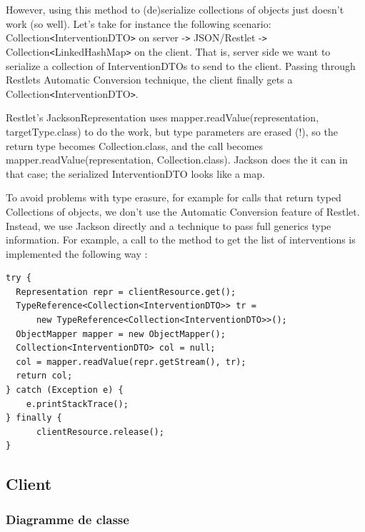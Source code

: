 \documentclass{article}
\begin{document}
However, using this method to (de)serialize collections of objects 
just doesn't work (so well). Let's take for instance the following scenario: Collection\texttt{<}InterventionDTO\texttt{>} 
on server -\texttt{>} JSON/Restlet -\texttt{>} Collection\texttt{<}LinkedHashMap\texttt{>} 
on the client. That is, server side we want to serialize a collection of InterventionDTOs 
to send to the client. Passing through Restlets Automatic Conversion technique, 
the client finally gets a Collection\texttt{<}InterventionDTO\texttt{>}.

Restlet's JacksonRepresentation uses mapper.readValue(representation, 
targetType.class) to do the work, but type parameters are erased (!), so the return 
type becomes Collection.class, and the call becomes mapper.readValue(representation, 
Collection.class). Jackson does the it can in that case; the serialized InterventionDTO 
looks like a map.

To avoid problems with type erasure, for example for calls that 
return typed Collections of objects, we don't use the Automatic Conversion feature 
of Restlet. Instead, we use Jackson directly and a technique to pass full generics 
type information. For example, a call to the method to get the list of interventions 
is implemented the following way :

\begin{lstlisting}
try {
  Representation repr = clientResource.get();
  TypeReference<Collection<InterventionDTO>> tr = 
      new TypeReference<Collection<InterventionDTO>>();
  ObjectMapper mapper = new ObjectMapper();
  Collection<InterventionDTO> col = null;
  col = mapper.readValue(repr.getStream(), tr);
  return col;
} catch (Exception e) {
    e.printStackTrace();
} finally {
      clientResource.release();
}
\end{lstlisting}


\subsection{Client}

\subsubsection{Diagramme de classe}
\end{document}
